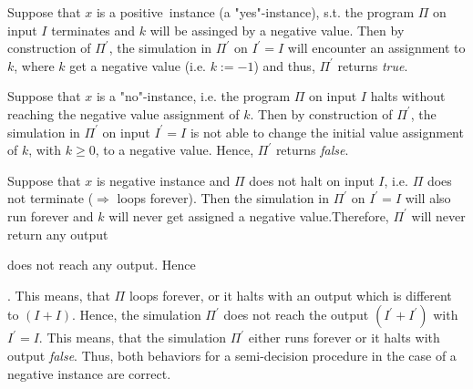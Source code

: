 \begin{description}
\item[\normalfont\slshape Case 1:] Suppose that $x$ is a positive\ instance
(a "yes"-instance), s.t. the program $\Pi $ on input $I$ terminates and $k$
will be assinged by a negative value. Then by construction of $\Pi ^{\prime
} $, the simulation in $\Pi ^{\prime }$ on $I^{\prime }=I$ will encounter an
assignment to $k$, where $k$ get a negative value (i.e. $k:=-1$) and thus, $%
\Pi ^{\prime }$ returns \textit{true}.

\item[\normalfont\slshape Case 2:] 

\item[a.)] Suppose that $x$ is a "no"-instance, i.e. the program $\Pi $ on
input $I$ halts without reaching the negative value assignment of $k$. Then
by construction of $\Pi ^{\prime }$, the simulation in $\Pi ^{\prime }$ on
input $I^{\prime }=I$ is not able to change the initial value assignment of $%
k$, with $k\geq 0$, to a negative value. Hence, $\Pi ^{\prime }$ returns 
\textit{false}.

\item[b.)] Suppose that $x$ is negative instance and $\Pi $ does not halt on
input $I$, i.e. $\Pi $ does not terminate ($\Rightarrow $ loops forever).
Then the simulation in $\Pi ^{\prime }$ on $I^{\prime }=I$ will also run
forever and $k$ will never get assigned a negative value.Therefore, $\Pi
^{\prime }$ will never return any output

\item does not reach any output. Hence

\item . This means, that $\Pi $ loops forever, or it halts with an output
which is different to $\left( I+I\right) $. Hence, the simulation $\Pi
^{\prime }$ does not reach the output $\left( I^{\prime }+I^{\prime }\right) 
$ with $I^{\prime }=I$. This means, that the simulation $\Pi ^{\prime }$
either runs forever or it halts with output \textit{false}. Thus, both
behaviors for a semi-decision procedure in the case of a negative instance
are correct.
\end{description}

\bigskip
